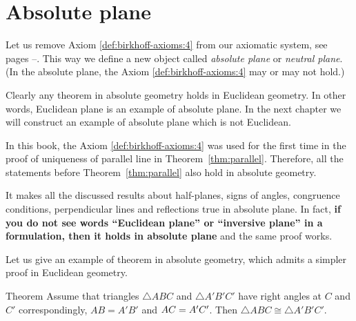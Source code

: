 \chapter{Absolute plane}\label{chap:non-euclid}

Let us remove Axiom \ref{def:birkhoff-axioms:4} from our axiomatic system, see pages \pageref{def:birkhoff-axioms:0}--\pageref{def:birkhoff-axioms:4}.
This way we define a new object called 
\emph{absolute plane} or \emph{neutral plane}.
(In the absolute plane, 
the Axiom \ref{def:birkhoff-axioms:4} may or may not hold.)

Clearly any theorem in absolute geometry holds in Euclidean geometry.
In other words, Euclidean plane is an example of absolute plane. 
In the next chapter we will construct an example of absolute plane which is not Euclidean.

In this book, 
the Axiom \ref{def:birkhoff-axioms:4} was used
for the first time in the proof of uniqueness of parallel line in Theorem~\ref{thm:parallel}.
Therefore, all the statements before Theorem~\ref{thm:parallel} also hold in absolute geometry.

It makes all the discussed results
about
half-planes,
signs of angles,
congruence conditions,
perpendicular lines and reflections 
true in absolute plane.
In fact, \textbf{if you do not see words ``Euclidean plane'' or ``inversive plane'' in a formulation,
then it holds in absolute plane} and the same proof works.

Let us give an example of theorem in absolute geometry,
which admits a simpler proof in Euclidean geometry. 

\begin{thm}{Theorem}
Assume that triangles $\triangle ABC$ and $\triangle A'B'C'$
have right angles at $C$ and $C'$ correspondingly, 
$AB=A'B'$ and $AC\z=A'C'$.
Then $\triangle ABC\cong\triangle A'B'C'$.
\end{thm}


